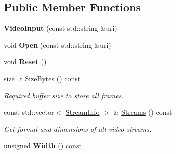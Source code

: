 \subsection*{Public Member Functions}
\begin{DoxyCompactItemize}
\item 
{\bfseries Video\+Input} (const std\+::string \&uri)\hypertarget{structpangolin_1_1_video_input_aa493b8cc70f37f8f1716faac95da849f}{}\label{structpangolin_1_1_video_input_aa493b8cc70f37f8f1716faac95da849f}

\item 
void {\bfseries Open} (const std\+::string \&uri)\hypertarget{structpangolin_1_1_video_input_a96e92ae039832e817b6fbb0950d7f306}{}\label{structpangolin_1_1_video_input_a96e92ae039832e817b6fbb0950d7f306}

\item 
void {\bfseries Reset} ()\hypertarget{structpangolin_1_1_video_input_a43626e55035ef4908501818842cc6ef7}{}\label{structpangolin_1_1_video_input_a43626e55035ef4908501818842cc6ef7}

\item 
size\+\_\+t \hyperlink{structpangolin_1_1_video_input_a93cee5c33386973a2a51165e6bdcf40b}{Size\+Bytes} () const \hypertarget{structpangolin_1_1_video_input_a93cee5c33386973a2a51165e6bdcf40b}{}\label{structpangolin_1_1_video_input_a93cee5c33386973a2a51165e6bdcf40b}

\begin{DoxyCompactList}\small\item\em Required buffer size to store all frames. \end{DoxyCompactList}\item 
const std\+::vector$<$ \hyperlink{classpangolin_1_1_stream_info}{Stream\+Info} $>$ \& \hyperlink{structpangolin_1_1_video_input_a9030d775d699c39ab7b7ba378c007c6a}{Streams} () const \hypertarget{structpangolin_1_1_video_input_a9030d775d699c39ab7b7ba378c007c6a}{}\label{structpangolin_1_1_video_input_a9030d775d699c39ab7b7ba378c007c6a}

\begin{DoxyCompactList}\small\item\em Get format and dimensions of all video streams. \end{DoxyCompactList}\item 
unsigned {\bfseries Width} () const \hypertarget{structpangolin_1_1_video_input_a5693d150348d4f5cfc1014443029f6aa}{}\label{structpangolin_1_1_video_input_a5693d150348d4f5cfc1014443029f6aa}


\end{DoxyCompactItemize}
